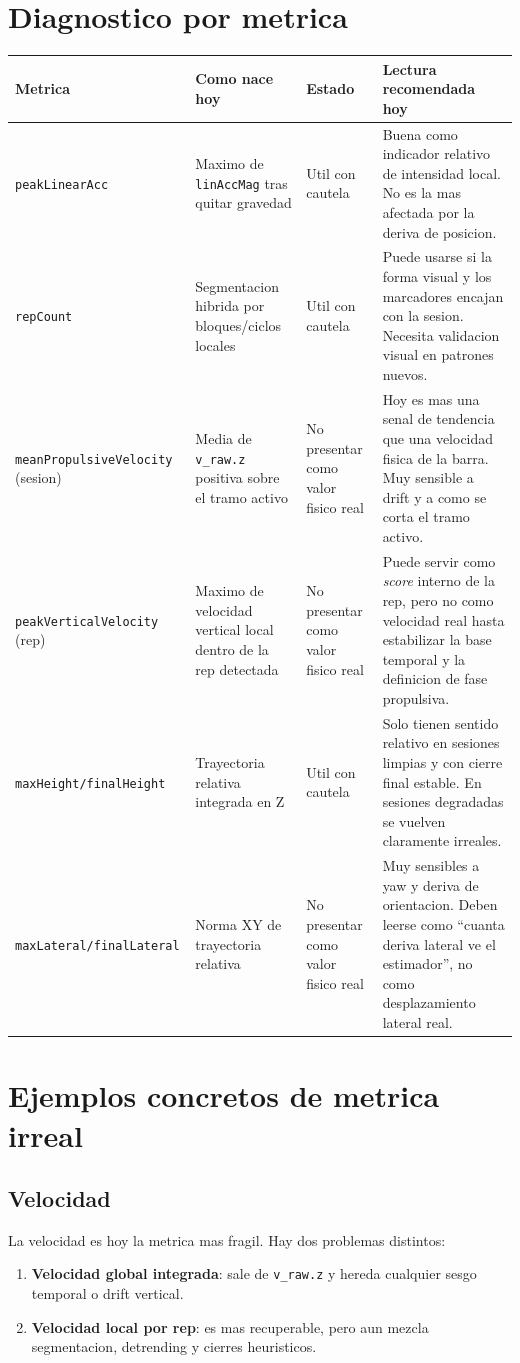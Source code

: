 \documentclass[11pt,a4paper]{article}
\begin{document}
\section{Diagnostico por metrica}
\begin{tabularx}{\textwidth}{p{3.2cm} p{5.1cm} p{2.9cm} X}
\toprule
Metrica & Como nace hoy & Estado & Lectura recomendada hoy \\
\midrule
\texttt{peakLinearAcc} & Maximo de \texttt{linAccMag} tras quitar gravedad & Util con cautela & Buena como indicador relativo de intensidad local. No es la mas afectada por la deriva de posicion. \\
\texttt{repCount} & Segmentacion hibrida por bloques/ciclos locales & Util con cautela & Puede usarse si la forma visual y los marcadores encajan con la sesion. Necesita validacion visual en patrones nuevos. \\
\texttt{meanPropulsiveVelocity} (sesion) & Media de \texttt{v\_raw.z} positiva sobre el tramo activo & No presentar como valor fisico real & Hoy es mas una senal de tendencia que una velocidad fisica de la barra. Muy sensible a drift y a como se corta el tramo activo. \\
\texttt{peakVerticalVelocity} (rep) & Maximo de velocidad vertical local dentro de la rep detectada & No presentar como valor fisico real & Puede servir como \emph{score} interno de la rep, pero no como velocidad real hasta estabilizar la base temporal y la definicion de fase propulsiva. \\
\texttt{maxHeight/finalHeight} & Trayectoria relativa integrada en Z & Util con cautela & Solo tienen sentido relativo en sesiones limpias y con cierre final estable. En sesiones degradadas se vuelven claramente irreales. \\
\texttt{maxLateral/finalLateral} & Norma XY de trayectoria relativa & No presentar como valor fisico real & Muy sensibles a yaw y deriva de orientacion. Deben leerse como ``cuanta deriva lateral ve el estimador'', no como desplazamiento lateral real. \\
\bottomrule
\end{tabularx}

\section{Ejemplos concretos de metrica irreal}
\subsection*{Velocidad}
La velocidad es hoy la metrica mas fragil. Hay dos problemas distintos:
\begin{enumerate}[leftmargin=16pt]
  \item \textbf{Velocidad global integrada}: sale de \texttt{v\_raw.z} y hereda cualquier sesgo temporal o drift vertical.
  \item \textbf{Velocidad local por rep}: es mas recuperable, pero aun mezcla segmentacion, detrending y cierres heuristicos.
\end{enumerate}
\end{document}
